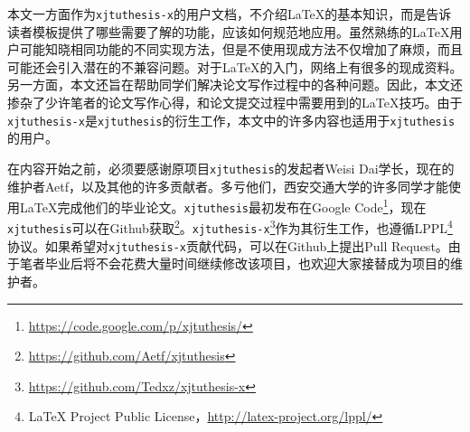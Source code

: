 本文一方面作为\texttt{xjtuthesis-x}的用户文档，不介绍\LaTeX 的基本知识，而是告诉读者模板提供了哪些需要了解的功能，应该如何规范地应用。虽然熟练的\LaTeX 用户可能知晓相同功能的不同实现方法，但是不使用现成方法不仅增加了麻烦，而且可能还会引入潜在的不兼容问题。对于\LaTeX 的入门，网络上有很多的现成资料。
另一方面，本文还旨在帮助同学们解决论文写作过程中的各种问题。因此，本文还掺杂了少许笔者的论文写作心得，和论文提交过程中需要用到的\LaTeX 技巧。由于\texttt{xjtuthesis-x}是\texttt{xjtuthesis}的衍生工作，本文中的许多内容也适用于\texttt{xjtuthesis}的用户。

在内容开始之前，必须要感谢原项目\texttt{xjtuthesis}的发起者Weisi Dai学长，现在的维护者Aetf，以及其他的许多贡献者。多亏他们，西安交通大学的许多同学才能使用\LaTeX 完成他们的毕业论文。\texttt{xjtuthesis}最初发布在Google Code\footnote{\url{https://code.google.com/p/xjtuthesis/}}，现在\texttt{xjtuthesis}可以在Github获取\footnote{\url{https://github.com/Aetf/xjtuthesis}}。\texttt{xjtuthesis-x}\footnote{\url{https://github.com/Tedxz/xjtuthesis-x}}作为其衍生工作，也遵循LPPL\footnote{LaTeX Project Public License，\url{http://latex-project.org/lppl/}}协议。如果希望对\texttt{xjtuthesis-x}贡献代码，可以在Github上提出Pull Request。由于笔者毕业后将不会花费大量时间继续修改该项目，也欢迎大家接替成为项目的维护者。
